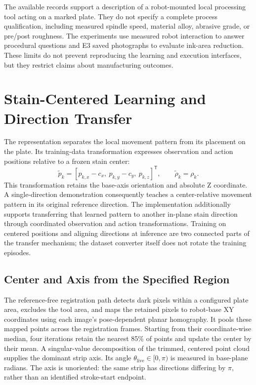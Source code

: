 The available records support a description of a robot-mounted local processing tool acting on a marked plate. They do not specify a complete process qualification, including measured spindle speed, material alloy, abrasive grade, or pre/post roughness. The experiments use measured robot interaction to answer procedural questions and E3 saved photographs to evaluate ink-area reduction. These limits do not prevent reproducing the learning and execution interfaces, but they restrict claims about manufacturing outcomes.

\section{Stain-Centered Learning and Direction Transfer}
\label{sec:stain_relative_generalization}
The representation separates the local movement pattern from its placement on the plate. Its training-data transformation expresses observation and action positions relative to a frozen stain center:
\begin{equation}
 \widetilde p_k=[p_{k,x}-c_x,\ p_{k,y}-c_y,\ p_{k,z}]^\mathsf{T},
 \qquad \widetilde\rho_k=\rho_k.
 \label{eq:relative_task_pose}
\end{equation}
This transformation retains the base-axis orientation and absolute Z coordinate. A single-direction demonstration consequently teaches a center-relative movement pattern in its original reference direction. The implementation additionally supports transferring that learned pattern to another in-plane stain direction through coordinated observation and action transformations. Training on centered positions and aligning directions at inference are two connected parts of the transfer mechanism; the dataset converter itself does not rotate the training episodes.

\subsection{Center and Axis from the Specified Region}
The reference-free registration path detects dark pixels within a configured plate area, excludes the tool area, and maps the retained pixels to robot-base XY coordinates using each image's pose-dependent planar homography. It pools these mapped points across the registration frames. Starting from their coordinate-wise median, four iterations retain the nearest 85\% of points and update the center by their mean. A singular-value decomposition of the trimmed, centered point cloud supplies the dominant strip axis. Its angle \(\theta_{\mathrm{live}}\in[0,\pi)\) is measured in base-plane radians. The axis is unoriented: the same strip has directions differing by \(\pi\), rather than an identified stroke-start endpoint.

